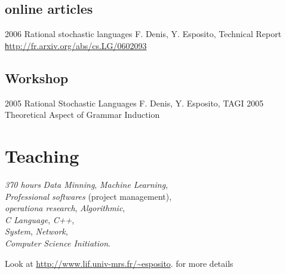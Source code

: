 \subsection*{online articles}

\article
{2006}
{Rational stochastic languages}
{ F. Denis, Y. Esposito,}
{Technical Report}
{\href{http://fr.arxiv.org/abs/cs.LG/0602093}{\texttt http\string://fr.arxiv.org/abs/cs.LG/0602093}}

\subsection*{Workshop}

\article
{2005}
{Rational Stochastic Languages}
{F. Denis, Y. Esposito,}
{TAGI 2005}
{Theoretical Aspect of Grammar Induction}

\section*{Teaching}

{\emph{370 hours}}
{\emph{Data Minning}, \emph{Machine Learning},\\
\emph{Professional softwares} (project management),\\
\emph{operationa research}, \emph{Algorithmic},\\
\emph{C Language}, \emph{C++},\\
\emph{System}, \emph{Network},\\
\emph{Computer Science Initiation}.
}

\footnotesize{
    Look at
    \href{http://www.lif.univ-mrs.fr/~esposito} 
    {http://www.lif.univ-mrs.fr/\textasciitilde{}esposito}.
    for more details
}



